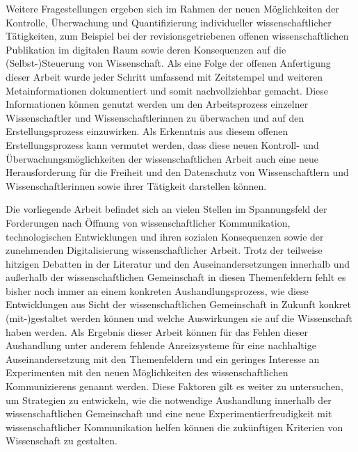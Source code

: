 Weitere Fragestellungen ergeben sich im Rahmen der neuen Möglichkeiten der Kontrolle, Überwachung und Quantifizierung individueller wissenschaftlicher Tätigkeiten, zum Beispiel bei der revisionsgetriebenen offenen wissenschaftlichen Publikation im digitalen Raum sowie deren Konsequenzen auf die (Selbst-)Steuerung von Wissenschaft. Als eine Folge der offenen Anfertigung dieser Arbeit wurde jeder Schritt umfassend mit Zeitstempel und weiteren Metainformationen dokumentiert und somit nachvollziehbar gemacht. Diese Informationen können genutzt werden um den Arbeitsprozess einzelner Wissenschaftler und Wissenschaftlerinnen zu überwachen und auf den Erstellungsprozess einzuwirken. Als Erkenntnis aus diesem offenen Erstellungsprozess kann vermutet werden, dass diese neuen Kontroll- und Überwachungsmöglichkeiten der wissenschaftlichen Arbeit auch eine neue Herausforderung für die Freiheit und den Datenschutz von Wissenschaftlern und Wissenschaftlerinnen sowie ihrer Tätigkeit darstellen können.

Die vorliegende Arbeit befindet sich an vielen Stellen im Spannungsfeld der Forderungen nach Öffnung von wissenschaftlicher Kommunikation, technologischen Entwicklungen und ihren sozialen Konsequenzen sowie der zunehmenden Digitalisierung wissenschaftlicher Arbeit. Trotz der teilweise hitzigen Debatten in der Literatur und den Auseinandersetzungen innerhalb und außerhalb der wissenschaftlichen Gemeinschaft in diesen Themenfeldern fehlt es bisher noch immer an einem konkreten Aushandlungsprozess, wie diese Entwicklungen aus Sicht der wissenschaftlichen Gemeinschaft in Zukunft konkret (mit-)gestaltet werden können und welche Auswirkungen sie auf die Wissenschaft haben werden. Als Ergebnis dieser Arbeit können für das Fehlen dieser Aushandlung unter anderem fehlende Anreizsysteme für eine nachhaltige Auseinandersetzung mit den Themenfeldern und ein geringes Interesse an Experimenten mit den neuen Möglichkeiten des wissenschaftlichen Kommunizierens genannt werden. Diese Faktoren gilt es weiter zu untersuchen, um Strategien zu entwickeln, wie die notwendige Aushandlung innerhalb der wissenschaftlichen Gemeinschaft und eine neue Experimentierfreudigkeit mit wissenschaftlicher Kommunikation helfen können die zukünftigen Kriterien von Wissenschaft zu gestalten.
